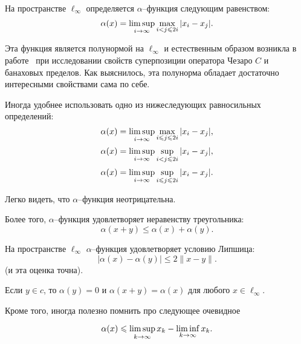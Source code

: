 На пространстве $\ell_\infty$ определяется $\alpha$--функция следующим равенством:
\begin{equation}
	\alpha(x) = \varlimsup_{i\to\infty} \max_{i<j\leqslant 2i} |x_i - x_j|
	.
\end{equation}

Эта функция является полунормой на $\ell_\infty$
и естественным образом возникла в работе~\cite[\S 2]{semenov2020invariant_noncommutative}
при исследовании свойств суперпозиции оператора Чезаро $C$ и банаховых пределов.
Как выяснилось, эта полунорма обладает достаточно интересными свойствами сама по себе.

Иногда удобнее использовать одно из нижеследующих равносильных определений:
\begin{equation}
	\alpha(x) = \varlimsup_{i\to\infty} \max_{i \leqslant j\leqslant 2i} |x_i - x_j|
	,
\end{equation}
\begin{equation}
	\alpha(x) = \varlimsup_{i\to\infty} \sup_{i<j\leqslant 2i} |x_i - x_j|
	,
\end{equation}
\begin{equation}
	\alpha(x) = \varlimsup_{i\to\infty} \sup_{i \leqslant j\leqslant 2i} |x_i - x_j|
	.
\end{equation}

Легко видеть, что $\alpha$--функция неотрицательна.
\begin{property}
	\label{thm:alpha_x_triangle_ineq}
	Более того, $\alpha$--функция удовлетворяет неравенству треугольника:
	\begin{equation}
		\alpha(x+y) \leq \alpha(x) + \alpha(y)
		.
	\end{equation}
\end{property}

\begin{property}
	На пространстве $\ell_\infty$ $\alpha$--функция удовлетворяет условию Липшица:
	\begin{equation}\label{alpha_Lipshitz}
		|\alpha(x) - \alpha(y)| \leq 2 \|x-y\|
		.
	\end{equation}
	(и эта оценка точна).
\end{property}

\begin{property}
	Если $y\in c$, то $\alpha(y) = 0$ и $\alpha(x+y) = \alpha(x)$ для любого $x \in \ell_\infty$.
\end{property}

Кроме того, иногда полезно помнить про следующее очевидное
\begin{property}
	\label{thm:alpha_x_leq_limsup_minus_liminf}
	\begin{equation}
		\alpha(x) \leq \varlimsup_{k\to\infty} x_k - \varliminf_{k\to\infty} x_k
		.
	\end{equation}
\end{property}

